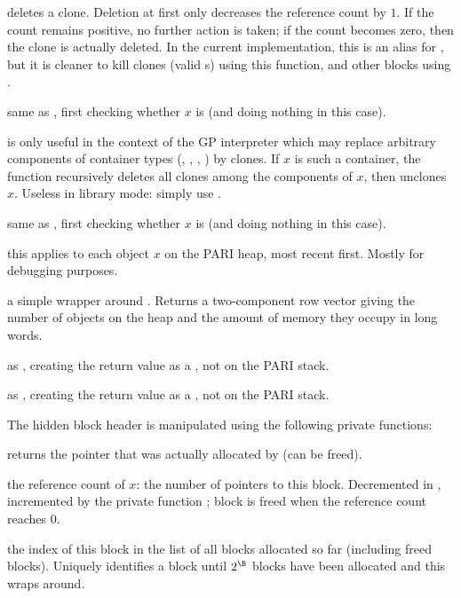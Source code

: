  deletes a clone. Deletion at first only decreases
the reference count by $1$. If the count remains positive, no further action is
taken; if the count becomes zero, then the clone is actually deleted. In the
current implementation, this is an alias for , but it is cleaner
to kill clones (valid s) using this function, and other blocks using
.

 same as , first checking
whether $x$ is  (and doing nothing in this case).

 is only useful in the context of the GP
interpreter which may replace arbitrary components of container types
(, , , ) by clones. If $x$ is such
a container, the function recursively deletes all clones among the components
of $x$, then unclones $x$. Useless in library mode: simply use
.

 same as , first
checking whether $x$ is  (and doing nothing in this case).

 this applies
 to each object $x$ on the PARI heap, most recent
first. Mostly for debugging purposes.

 a simple wrapper around . Returns  a
two-component row vector giving the number of objects on the heap and the
amount of memory they occupy in long words.

 as , creating the return
value as a , not on the PARI stack.

 as , creating the return
value as a , not on the PARI stack.

 The hidden block header is manipulated using the
following private functions:

 returns the pointer that was actually allocated
by  (can be freed).

 the reference count of $x$: the number of pointers
to this block. Decremented in , incremented by the private
function ; block is freed when the reference
count reaches $0$.

 the index of this block in the list of all blocks
allocated so far (including freed blocks). Uniquely identifies a block until
$2^\B$ blocks have been allocated and this wraps around.

